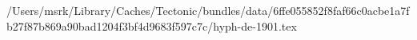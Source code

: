 /Users/msrk/Library/Caches/Tectonic/bundles/data/6ffe055852f8faf66c0acbe1a7fb27f87b869a90bad1204f3bf4d9683f597c7c/hyph-de-1901.tex